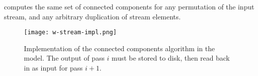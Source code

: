 \begin{observation} 
\label{obs:wstreamreqs}
\DFR computes the same set of connected components for any permutation of
the input stream, and any arbitrary duplication of stream elements.
\end{observation} 

 

\begin{figure}[htb]
\begin{center}
\texttt{[image: w-stream-impl.png]} \\
\end{center}
\caption{\label{fig:wstream-impl} Implementation of the \DFR connected
components algorithm in the \WStream model.
The output of pass $i$ must be stored to disk, then read back in as input
for pass $i+1$.}
\end{figure}

\iffalse
Note that since the \WStream model does not tolerate deletions, there is
no need to maintain the graph itself.  At pass $i$,  $G_{A_i}$ is a spanning
tree of input graph edges, but $G_{B_i}$ is simply a collection of ``stars'': a
relation that associates every vertex with a vertex representative (potentially
itself) shared by a set of connected vertices.
\fi




